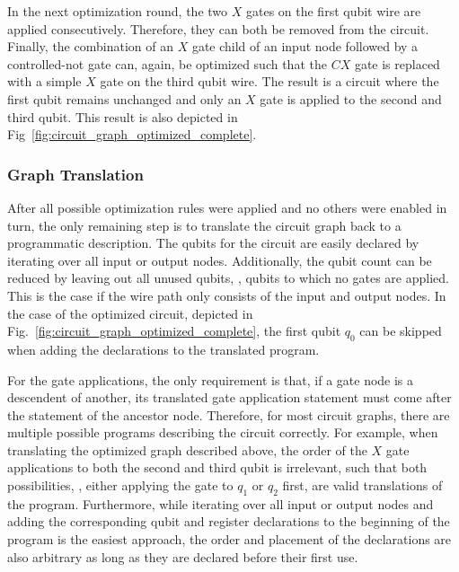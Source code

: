 In the next optimization round, the two $X$ gates on the first qubit wire are applied consecutively. Therefore, they can both be removed from the circuit. Finally, the combination of an $X$ gate child of an input node followed by a controlled-not gate can, again, be optimized such that the $CX$ gate is replaced with a simple $X$ gate on the third qubit wire. The result is a circuit where the first qubit remains unchanged and only an $X$ gate is applied to the second and third qubit. This result is also depicted in Fig~\ref{fig:circuit_graph_optimized_complete}. 

\subsubsection{Graph Translation}
After all possible optimization rules were applied and no others were enabled in turn, the only remaining step is to translate the circuit graph back to a programmatic description. The qubits for the circuit are easily declared by iterating over all input or output nodes. Additionally, the qubit count can be reduced by leaving out all unused qubits, \ie, qubits to which no gates are applied. This is the case if the wire path only consists of the input and output nodes. In the case of the optimized circuit, depicted in Fig.~\ref{fig:circuit_graph_optimized_complete}, the first qubit $q_0$ can be skipped when adding the declarations to the translated program.

For the gate applications, the only requirement is that, if a gate node is a descendent of another, its translated gate application statement must come after the statement of the ancestor node. Therefore, for most circuit graphs, there are multiple possible programs describing the circuit correctly. For example, when translating the optimized graph described above, the order of the $X$ gate applications to both the second and third qubit is irrelevant, such that both possibilities, \ie, either applying the gate to $q_1$ or $q_2$ first, are valid translations of the program. Furthermore, while iterating over all input or output nodes and adding the corresponding qubit and register declarations to the beginning of the program is the easiest approach, the order and placement of the declarations are also arbitrary as long as they are declared before their first use. 

